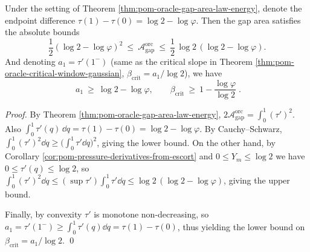 \begin{corollary}\label{cor:pom-oracle-gap-area-universal-bounds-beta-crit}
Under the setting of Theorem \ref{thm:pom-oracle-gap-area-law-energy}, denote the endpoint difference
\(
\tau(1)-\tau(0)=\log 2-\log\varphi
\).
Then the gap area satisfies the absolute bounds
\[
\boxed{\;
\frac12(\log 2-\log\varphi)^2\ \le\ \mathcal{A}^{\mathrm{orc}}_{\mathrm{gap}}\ \le\ \frac12\,\log 2\,(\log 2-\log\varphi).\;}
\]
And denoting \(a_1=\tau'(1^-)\) (same as the critical slope in Theorem \ref{thm:pom-oracle-critical-window-gaussian}, \(\beta_{\mathrm{crit}}=a_1/\log 2\)), we have
\[
\boxed{\;
a_1\ \ge\ \log 2-\log\varphi,
\qquad
\beta_{\mathrm{crit}}\ \ge\ 1-\frac{\log\varphi}{\log 2}\; }.
\]
\end{corollary}
\begin{proof}
By Theorem \ref{thm:pom-oracle-gap-area-law-energy},
\(
2\mathcal{A}^{\mathrm{orc}}_{\mathrm{gap}}=\int_0^1(\tau')^2
\).
Also
\(
\int_0^1\tau'(q)\,\dd q=\tau(1)-\tau(0)=\log 2-\log\varphi
\).
By Cauchy--Schwarz,
\(
\int_0^1(\tau')^2\dd q\ge \bigl(\int_0^1\tau'\dd q\bigr)^2
\), giving the lower bound.
On the other hand, by Corollary \ref{cor:pom-pressure-derivatives-from-escort} and \(0\le Y_m\le \log 2\) we have \(0\le \tau'(q)\le \log 2\), so
\(
\int_0^1(\tau')^2\dd q\le (\sup\tau')\int_0^1\tau'\dd q\le \log 2\,(\log 2-\log\varphi)
\), giving the upper bound.
\par
Finally, by convexity \(\tau'\) is monotone non-decreasing, so \(a_1=\tau'(1^-)\ge \int_0^1\tau'(q)\dd q=\tau(1)-\tau(0)\), thus yielding the lower bound on \(\beta_{\mathrm{crit}}=a_1/\log 2\). \qed
\end{proof}

